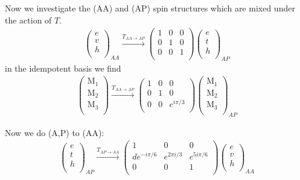 \documentclass[12pt,a4paper]{article}
\newcounter{arrow}
\begin{document}
Now we investigate the (AA) and (AP) spin structures which are mixed under the action of $T$.
\begin{align}
\left( \begin{matrix}
e\\
v\\
h\\
\end{matrix} \right)_{AA}
\xrightarrow{T_{AA \rightarrow AP}}
\left(\begin{matrix} 
1 & 0 &0 \\
0 & 1 & 0 \\
0 & 0 & 1\\
\end{matrix} \right)
\left( \begin{matrix}
e\\
t\\
h\\
\end{matrix} \right)_{AP}
\end{align}
in the idempotent basis we find
\begin{align}
\left( \begin{matrix}
\text{M}_1\\
\text{M}_2\\
\text{M}_3\\
\end{matrix} \right) 
\xrightarrow{T_{AA \rightarrow AP}} 
\left(\begin{matrix} 
1 & 0 &0 \\
0 & 1 & 0 \\
0 & 0 & e^{i \pi /3} \\
\end{matrix} \right)
\left( \begin{matrix}
\text{M}_1\\
\text{M}_2\\
\text{M}_3\\
\end{matrix} \right)_{AP}
\end{align}

Now we do (A,P) to (AA):
\begin{align}
\left( \begin{matrix}
e\\
t\\
h\\
\end{matrix} \right)_{AP}
\xrightarrow{T_{AP \rightarrow AA}}
\left(\begin{matrix} 
1 & 0 &0 \\
de^{-i \pi /6} &e^{2\pi i /3} &e^{5 i \pi /6} \\
0 & 0 & 1\\
\end{matrix} \right)
\left( \begin{matrix}
e\\
v\\
h\\
\end{matrix} \right)_{AA}
\end{align}
\end{document}
